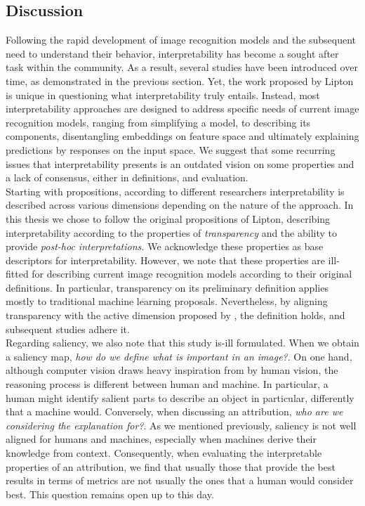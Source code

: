 \subsection{Discussion}
\label{sec:rel_interp_discussion}
Following the rapid development of image recognition models and the subsequent need to understand 
their behavior, interpretability has become a sought after task within the community. As a result, 
several studies have been introduced over time, as demonstrated in the previous section. Yet, the 
work proposed by Lipton is unique in questioning what interpretability truly entails. 
Instead, most interpretability approaches are designed to address specific needs of current image 
recognition models, ranging from simplifying a model, to describing its components, disentangling 
embeddings on feature space and ultimately explaining predictions by responses on the input space. 
We suggest that some recurring issues that interpretability presents is an outdated vision on some 
properties and a lack of consensus, either in definitions, and evaluation.\\

\noindent Starting with propositions, according to different researchers interpretability is 
described across various dimensions depending on the nature of the approach. In this thesis we 
chose to follow the original propositions of Lipton, describing interpretability according to the 
properties of \emph{transparency} and the ability to provide \emph{post-hoc interpretations.} We 
acknowledge these properties as base descriptors for interpretability. However, we note that these 
properties are ill-fitted for describing current image recognition models according 
to their original definitions. In particular, transparency on its preliminary definition applies 
mostly to traditional machine learning proposals. Nevertheless, by aligning transparency with 
the active dimension proposed by \cite{zhang2021survey}, the definition holds, and subsequent 
studies adhere it.\\

\noindent Regarding saliency, we also note that this study is-ill formulated. When we obtain a 
saliency map, \emph{how do we define what is important in an image?}. On one hand, although computer  
vision draws heavy inspiration from by human vision, the reasoning process is different between 
human and machine. In particular, a human might identify salient parts to describe an object in 
particular, differently that a machine would. Conversely, when discussing an attribution, 
\emph{who are we considering the explanation for?}. As we mentioned previously, saliency is not 
well aligned for humans and machines, especially when machines derive their knowledge from context. 
Consequently, when evaluating the interpretable properties of an attribution, we find that usually 
those that provide the best results in terms of metrics are not usually the ones that a human 
would consider best. This question remains open up to this day.\\

